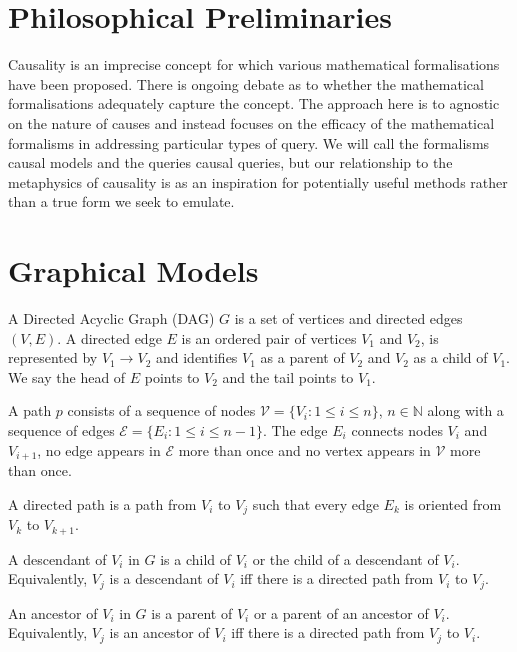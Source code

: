 
\section{Philosophical Preliminaries}

Causality is an imprecise concept for which various mathematical formalisations have been proposed. There is ongoing debate as to whether the mathematical formalisations adequately capture the concept. The approach here is to agnostic on the nature of causes and instead focuses on the efficacy of the mathematical formalisms in addressing particular types of query. We will call the formalisms causal models and the queries causal queries, but our relationship to the metaphysics of causality is as an inspiration for potentially useful methods rather than a true form we seek to emulate.

\section{Graphical Models}


\begin{definition}
A Directed Acyclic Graph (DAG) $G$ is a set of vertices and directed edges $(V,E)$. A directed edge $E$ is an ordered pair of vertices $V_1$ and $V_2$, is represented by $V_1 \to V_2$ and identifies $V_1$ as a parent of $V_2$ and $V_2$ as a child of $V_1$. We say the head of $E$ points to $V_2$ and the tail points to $V_1$.
\end{definition}

\begin{definition}
A path $p$ consists of a sequence of nodes $\mathcal{V}=\{V_i:1\leq i \leq n\}$, $n\in\mathbb{N}$ along with a sequence of edges $\mathcal{E}=\{E_i:1\leq i \leq n-1\}$. The edge $E_i$ connects nodes $V_i$ and $V_{i+1}$, no edge appears in $\mathcal{E}$ more than once and no vertex appears in $\mathcal{V}$ more than once.

A directed path is a path from $V_i$ to $V_j$ such that every edge $E_k$ is oriented from $V_k$ to $V_{k+1}$.
\end{definition}

\begin{definition}\label{def:descendants_and_ancestors}
A descendant of $V_i$ in $G$ is a child of $V_i$ or the child of a descendant of $V_i$. Equivalently, $V_j$ is a descendant of $V_i$ iff there is a directed path from $V_i$ to $V_j$.

An ancestor of $V_i$ in $G$ is a parent of $V_i$ or a parent of an ancestor of $V_i$. Equivalently, $V_j$ is an ancestor of $V_i$ iff there is a directed path from $V_j$ to $V_i$.
\end{definition}

